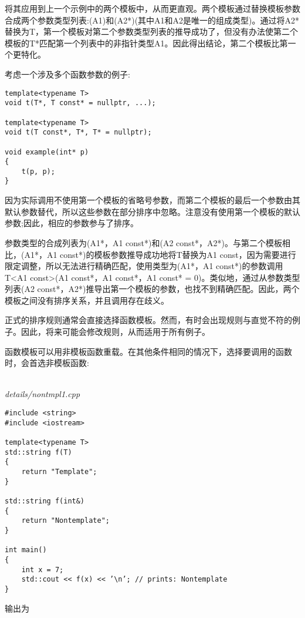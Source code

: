 将其应用到上一个示例中的两个模板中，从而更直观。两个模板通过替换模板参数合成两个参数类型列表:(A1)和(A2*)(其中A1和A2是唯一的组成类型)。通过将A2*替换为T，第一个模板对第二个参数类型列表的推导成功了，但没有办法使第二个模板的T*匹配第一个列表中的非指针类型A1。因此得出结论，第二个模板比第一个更特化。

考虑一个涉及多个函数参数的例子:

\begin{lstlisting}[style=styleCXX]
template<typename T>
void t(T*, T const* = nullptr, ...);

template<typename T>
void t(T const*, T*, T* = nullptr);

void example(int* p)
{
	t(p, p);
}
\end{lstlisting}

因为实际调用不使用第一个模板的省略号参数，而第二个模板的最后一个参数由其默认参数替代，所以这些参数在部分排序中忽略。注意没有使用第一个模板的默认参数;因此，相应的参数参与了排序。

参数类型的合成列表为(A1*，A1 const*)和(A2 const*，A2*)。与第二个模板相比，(A1*，A1 const*)的模板参数推导成功地将T替换为A1 const，因为需要进行限定调整，所以无法进行精确匹配，使用类型为(A1*，A1 const*)的参数调用T<A1 const>(A1 const*，A1 const*，A1 const* = 0)。类似地，通过从参数类型列表(A2 const*，A2*)推导出第一个模板的参数，也找不到精确匹配。因此，两个模板之间没有排序关系，并且调用存在歧义。

正式的排序规则通常会直接选择函数模板。然而，有时会出现规则与直觉不符的例子。因此，将来可能会修改规则，从而适用于所有例子。


函数模板可以用非模板函数重载。在其他条件相同的情况下，选择要调用的函数时，会首选非模板函数:

\hspace*{\fill} \\ %
\noindent
\textit{details/nontmpl1.cpp}
\begin{lstlisting}[style=styleCXX]
#include <string>
#include <iostream>

template<typename T>
std::string f(T)
{
	return "Template";
}

std::string f(int&)
{
	return "Nontemplate";
}

int main()
{
	int x = 7;
	std::cout << f(x) << ’\n’; // prints: Nontemplate
}
\end{lstlisting}

输出为

